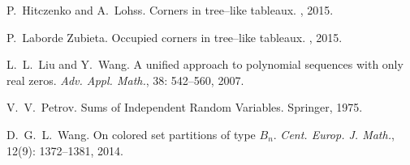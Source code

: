 \documentclass[10pt]{amsart}
\numberwithin{subcase}{case}
\begin{document}
\begin{thebibliography}{14}
P.~Hitczenko  and A.~Lohss.
\newblock Corners in tree--like  tableaux.
, 2015.

P.~Laborde Zubieta.
\newblock Occupied corners in tree--like  tableaux.
, 2015.

L.~L.~Liu and Y.~Wang.
\newblock A unified approach to polynomial sequences with only real zeros.
\newblock \textit{Adv. Appl. Math.}, 38: 542--560, 2007.

V.~V.~Petrov. 
\newblock Sums of Independent Random Variables.
\newblock Springer, 1975.

D.~G.~L.~Wang.
\newblock On colored set partitions of type $B_n$.
\newblock \textit{Cent. Europ. J. Math.}, 12(9): 1372--1381, 2014.

\end{thebibliography}
\end{document}
